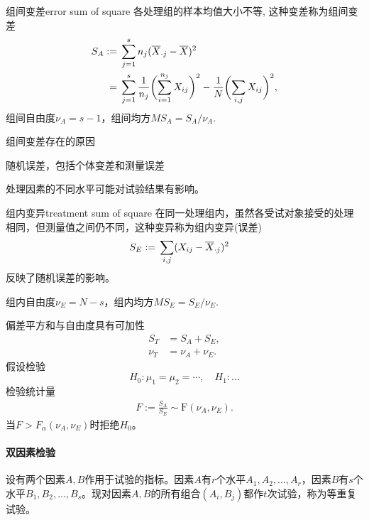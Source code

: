 \begin{definition}{组间变差}{error sum of square}
	各处理组的样本均值大小不等, 这种变差称为组间变差%
	\begin{align}
		S_A:={}&\sum_{j=1}^sn_j(\overline{X}_{\cdot j}-\overline{X})^2\\\notag
		={}&\sum_{j=1}^s\frac1{n_j}\biggl(\sum_{i=1}^{n_j}X_{ij}\biggr)^2-\frac1N\biggl(\sum_{i,j}X_{ij}\biggr)^2,
	\end{align}
	组间自由度$\nu_A=s-1$，组间均方$MS_A=S_A/\nu_A.$
\end{definition}
组间变差存在的原因
\begin{compactitem}
	\item 随机误差，包括个体变差和测量误差
	\item 处理因素的不同水平可能对试验结果有影响。
\end{compactitem}
\begin{definition}{组内变异}{treatment sum of square}
	在同一处理组内，虽然各受试对象接受的处理相同，但测量值之间仍不同，这种变异称为组内变异(误差)
	\begin{align}
		S_E:={}&\sum_{i,j}(X_{ij}-\avg X_{\cdot j})^2%
	\end{align}
	反映了随机误差的影响。

	组内自由度$\nu_E=N-s$，组内均方$MS_E=S_E/\nu_E.$
\end{definition}
偏差平方和与自由度具有可加性
\begin{align*}
	S_T&=S_A+S_E,\\
	\nu_T&=\nu_A+\nu_E.
\end{align*}
假设检验
\[
	H_0:\mu_1=\mu_2=\cdots,\quad H_1:\ldots
\]
检验统计量 
\begin{align}
	F:=\frac{S_A}{S_E}\sim\mathrm F(\nu_A,\nu_E).
\end{align}
当$F>F_\alpha(\nu_A,\nu_E)$时拒绝$H_0$。
\paragraph{双因素检验}
设有两个因素$A,B$作用于试验的指标。因素$ A $有$ r $个水平$ A_1, A_2,\ldots, A_r$，因素$ B $有$ s $个水平$ B_1, B_2,\ldots, B_s $。现对因素$ A, B $的所有组合$(A_i, B_j)$都作$t$次试验，称为等重复试验。

